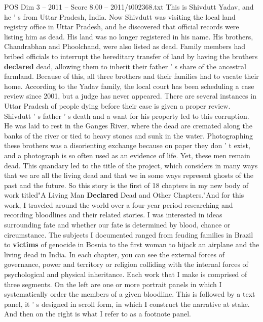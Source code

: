 \begin{textsample}{POS Dim 3 – 2011 – Score 8.00 – 2011/t002368.txt}  \label{ex:f3_pos_061}
This is Shivdutt Yadav, and he ' s from Uttar Pradesh, India.
Now Shivdutt was visiting the local land registry office in Uttar Pradesh, and he discovered that official records were listing him as dead.
His land was no longer registered in his name.
His brothers, Chandrabhan and Phoolchand, were also listed as dead.
Family members had bribed officials to interrupt the hereditary transfer of land by having the brothers \textbf{declared} dead, allowing them to inherit their father ' s share of the ancestral farmland.
Because of this, all three brothers and their families had to vacate their home.
According to the Yadav family, the local court has been scheduling a case review since 2001, but a judge has never appeared.
There are several instances in Uttar Pradesh of people dying before their case is given a proper review.
Shivdutt ' s father ' s death and a want for his property led to this corruption.
He was laid to rest in the Ganges River, where the dead are cremated along the banks of the river or tied to heavy stones and sunk in the water.
Photographing these brothers was a disorienting exchange because on paper they don ' t exist, and a photograph is so often used as an evidence of life.
Yet, these men remain dead.
This quandary led to the title of the project, which considers in many ways that we are all the living dead and that we in some ways represent ghosts of the past and the future.
So this story is the first of 18 chapters in my new body of work titled"A Living Man \textbf{Declared} Dead and Other Chapters."And for this work, I traveled around the world over a four-year period researching and recording bloodlines and their related stories.
I was interested in ideas surrounding fate and whether our fate is determined by blood, chance or circumstance.
The subjects I documented ranged from feuding families in Brazil to \textbf{victims} of genocide in Bosnia to the first woman to hijack an airplane and the living dead in India.
In each chapter, you can see the external forces of governance, power and territory or religion colliding with the internal forces of psychological and physical inheritance.
Each work that I make is comprised of three segments.
On the left are one or more portrait panels in which I systematically order the members of a given bloodline.
This is followed by a text panel, it ' s designed in scroll form, in which I construct the narrative at stake.
And then on the right is what I refer to as a footnote panel.

\end{textsample}
